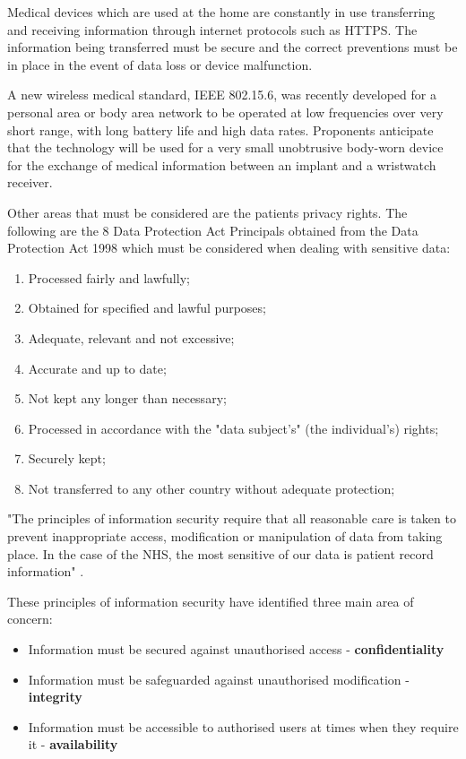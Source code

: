 Medical devices which are used at the home are constantly in use transferring and receiving information through internet protocols such as HTTPS. The information being transferred must be secure and the correct preventions must be in place in the event of data loss or device malfunction. 

A new wireless medical standard, IEEE 802.15.6, was recently developed for a personal area or body area network to be operated at low frequencies over very short range, with long battery life and high data rates. Proponents anticipate that the technology will be used for a very small unobtrusive body-worn device for the exchange of medical information between an implant and a wristwatch receiver. 

Other areas that must be considered are the patients privacy rights. The following are the 8 Data Protection Act Principals obtained from the Data Protection Act 1998 \parencite{data} which must be considered when dealing with  sensitive data:

\begin{enumerate}
\item Processed fairly and lawfully;
\item Obtained for specified and lawful purposes;
\item Adequate, relevant and not excessive;
\item Accurate and up to date;
\item Not kept any longer than necessary;
\item Processed in accordance with the "data subject’s" (the individual’s) rights;
\item Securely kept;
\item Not transferred to any other country without adequate protection;
\end{enumerate}

"The principles of information security require that all reasonable care is taken to prevent inappropriate access, modification or manipulation of data from taking place. In the case of the NHS, the most sensitive of our data is patient record information" \parencite{isec}.

These principles of information security have identified three main area of concern:
\begin{itemize}
\item Information must be secured against unauthorised access - \textbf{confidentiality} 
\item Information must be safeguarded against unauthorised modification - \textbf{integrity} 
\item Information must be accessible to authorised users at times when they require it - \textbf{availability} 
\end{itemize}

